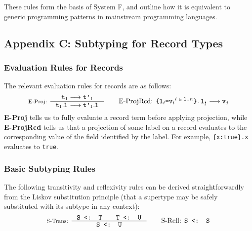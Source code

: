 These rules form the basis of System F, and outline how it is equivalent to generic programming patterns in mainstream programming languages.

\subsection{Appendix C: Subtyping for Record Types}
\label{sec:AppC}

\subsubsection*{Evaluation Rules for Records}

The relevant evaluation rules for records are as follows:
\begin{align*}
\inference[E-Proj: ]{
  \tm{t}{1} \longrightarrow \tm{t'}{1}
}{\tm{t}{1}.\tm{l}{} \longrightarrow \tm{t'}{1}.\tm{l}{}}
\quad \quad 
\textnormal{E-ProjRcd: }\texttt{\{\sb{l}{$i$}=\sbsp{v}{$i$}{$i \in 1..n$}\}.\sb{l}{j}} \longrightarrow \texttt{\sb{v}{$j$}}
\end{align*}
\textbf{E-Proj} tells us to fully evaluate a record term before applying projection, while \textbf{E-ProjRcd} tells us that a projection of some label  on a record evaluates to the corresponding value  of the field identified by the label. For example, \texttt{\{x:true\}.x} evaluates to \texttt{true}.

\subsubsection*{Basic Subtyping Rules}

The following transitivity and reflexivity rules can be derived straightforwardly from the Liskov substitution principle (that a supertype may be safely substituted with its subtype in any context):
\begin{align*}
\inference[S-Trans: ]{
  \texttt{S <: T} \quad \quad \texttt{T <: U}
}{\texttt{S <: U}}
\quad \quad
\textnormal{S-Refl: } \texttt{S <: S}
\end{align*}
